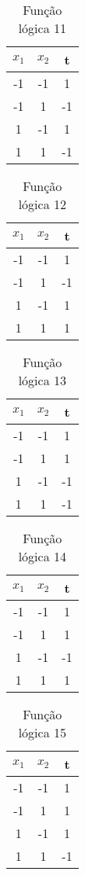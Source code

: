 \begin{table}[H]
\centering
\begin{tabular}{|c|c|c|}
\hline
 $x_1$ & $x_2$ & t\\ \hline
 -1 & -1 & 1\\ \hline
 -1 & 1 & -1\\ \hline
 1 & -1 & 1\\ \hline
 1 & 1 & -1\\ \hline
\end{tabular}
\caption{Função lógica 11}\label{tab:11}\end{table}

\begin{table}[H]
\centering
\begin{tabular}{|c|c|c|}
\hline
 $x_1$ & $x_2$ & t\\ \hline
 -1 & -1 & 1\\ \hline
 -1 & 1 & -1\\ \hline
 1 & -1 & 1\\ \hline
 1 & 1 & 1\\ \hline
\end{tabular}
\caption{Função lógica 12}\label{tab:12}\end{table}

\begin{table}[H]
\centering
\begin{tabular}{|c|c|c|}
\hline
 $x_1$ & $x_2$ & t\\ \hline
 -1 & -1 & 1\\ \hline
 -1 & 1 & 1\\ \hline
 1 & -1 & -1\\ \hline
 1 & 1 & -1\\ \hline
\end{tabular}
\caption{Função lógica 13}\label{tab:13}\end{table}

\begin{table}[H]
\centering
\begin{tabular}{|c|c|c|}
\hline
 $x_1$ & $x_2$ & t\\ \hline
 -1 & -1 & 1\\ \hline
 -1 & 1 & 1\\ \hline
 1 & -1 & -1\\ \hline
 1 & 1 & 1\\ \hline
\end{tabular}
\caption{Função lógica 14}\label{tab:14}\end{table}

\begin{table}[H]
\centering
\begin{tabular}{|c|c|c|}
\hline
 $x_1$ & $x_2$ & t\\ \hline
 -1 & -1 & 1\\ \hline
 -1 & 1 & 1\\ \hline
 1 & -1 & 1\\ \hline
 1 & 1 & -1\\ \hline
\end{tabular}
\caption{Função lógica 15}\label{tab:15}\end{table}

